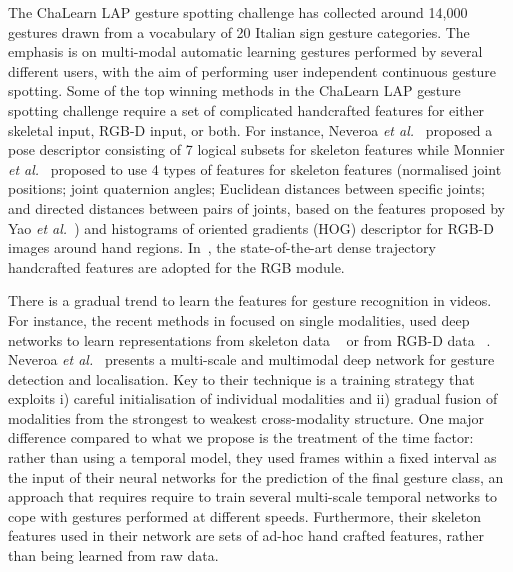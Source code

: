 The ChaLearn LAP \cite{chalearnLAP} gesture spotting challenge has collected around 14,000 gestures drawn from a vocabulary of 20 Italian sign gesture categories. The emphasis is on multi-modal automatic learning gestures performed by several different users, with the aim of performing user independent continuous gesture spotting.
Some of the top winning methods in the ChaLearn LAP gesture spotting challenge require a set of complicated handcrafted features for either skeletal input, RGB-D input, or both.
For instance, Neveroa \emph{et al.}~\cite{neverova2014multi} proposed a pose descriptor consisting of 7 logical subsets for skeleton features while Monnier \emph{et al.}~\cite{Monnier2014multi} proposed to use 4 types of features for skeleton features (normalised joint positions; joint quaternion angles; Euclidean distances between specific joints; and directed distances between pairs of joints, based on the features proposed by Yao \emph{et al.}~\cite{yao2011does}) and histograms of oriented gradients (HOG) descriptor for RGB-D images around hand regions.
In~\cite{Peng2014multi}, the state-of-the-art dense trajectory~\cite{wang2013dense} handcrafted features are adopted for the RGB module.

There is a gradual trend to learn the features for gesture recognition in videos.
%
For instance, the recent methods in \cite{wu2014deep,lio2014deep} focused on single modalities,
used deep networks to learn representations from skeleton data ~\cite{wu2014deep} or from RGB-D data ~\cite{lio2014deep}.
%
Neveroa \emph{et al.}~\cite{neverova2014multi} presents a multi-scale and multimodal deep network for gesture detection and localisation.
Key to their technique is a training strategy that exploits i) careful initialisation of individual modalities and ii) gradual fusion of modalities from the strongest to weakest cross-modality structure.
%
One major difference compared to what we propose is the treatment of the time factor:
rather than using a temporal model, they used frames within a fixed interval as the input of their neural networks
for the prediction of the final gesture class, an approach that
requires require to train several multi-scale temporal networks  to cope with gestures performed at different speeds.
%
Furthermore, their skeleton features used in their network are sets of ad-hoc hand crafted features, rather than being
learned from raw data.


\endinput
